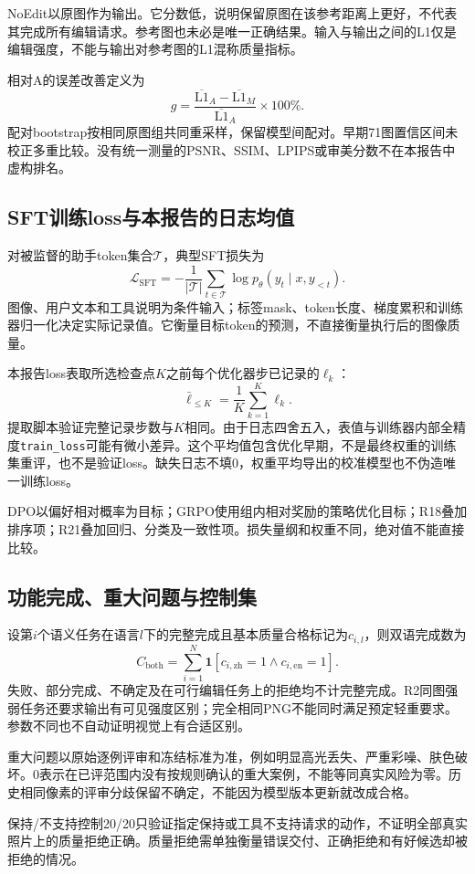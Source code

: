 \documentclass[UTF8,fontset=none,zihao=5,a4paper]{ctexart}
\begin{document}
NoEdit以原图作为输出。它分数低，说明保留原图在该参考距离上更好，不代表其完成所有编辑请求。参考图也未必是唯一正确结果。输入与输出之间的L1仅是编辑强度，不能与输出对参考图的L1混称质量指标。

相对A的误差改善定义为
\[
g=\frac{\overline{\mathrm{L1}}_A-\overline{\mathrm{L1}}_M}{\overline{\mathrm{L1}}_A}\times100\%.
\]
配对bootstrap按相同原图组共同重采样，保留模型间配对。早期71图置信区间未校正多重比较。没有统一测量的PSNR、SSIM、LPIPS或审美分数不在本报告中虚构排名。

\subsection{SFT训练loss与本报告的日志均值}
对被监督的助手token集合$\mathcal T$，典型SFT损失为
\[
\mathcal L_{\mathrm{SFT}}=-\frac1{|\mathcal T|}\sum_{t\in\mathcal T}\log p_\theta(y_t\mid x,y_{<t}).
\]
图像、用户文本和工具说明为条件输入；标签mask、token长度、梯度累积和训练器归一化决定实际记录值。它衡量目标token的预测，不直接衡量执行后的图像质量。

本报告loss表取所选检查点$K$之前每个优化器步已记录的$\ell_k$：
\[
\bar\ell_{\le K}=\frac1K\sum_{k=1}^{K}\ell_k.
\]
提取脚本验证完整记录步数与$K$相同。由于日志四舍五入，表值与训练器内部全精度\texttt{train\_loss}可能有微小差异。这个平均值包含优化早期，不是最终权重的训练集重评，也不是验证loss。缺失日志不填0，权重平均导出的校准模型也不伪造唯一训练loss。

DPO以偏好相对概率为目标；GRPO使用组内相对奖励的策略优化目标；R18叠加排序项；R21叠加回归、分类及一致性项。损失量纲和权重不同，绝对值不能直接比较。
\clearpage

\subsection{功能完成、重大问题与控制集}
设第$i$个语义任务在语言$l$下的完整完成且基本质量合格标记为$c_{i,l}$，则双语完成数为
\[
C_{\mathrm{both}}=\sum_{i=1}^{N}\mathbf1[c_{i,\mathrm{zh}}=1\land c_{i,\mathrm{en}}=1].
\]
失败、部分完成、不确定及在可行编辑任务上的拒绝均不计完整完成。R2同图强弱任务还要求输出有可见强度区别；完全相同PNG不能同时满足预定轻重要求。参数不同也不自动证明视觉上有合适区别。

重大问题以原始逐例评审和冻结标准为准，例如明显高光丢失、严重彩噪、肤色破坏。0表示在已评范围内没有按规则确认的重大案例，不能等同真实风险为零。历史相同像素的评审分歧保留不确定，不能因为模型版本更新就改成合格。

保持/不支持控制20/20只验证指定保持或工具不支持请求的动作，不证明全部真实照片上的质量拒绝正确。质量拒绝需单独衡量错误交付、正确拒绝和有好候选却被拒绝的情况。
\end{document}
